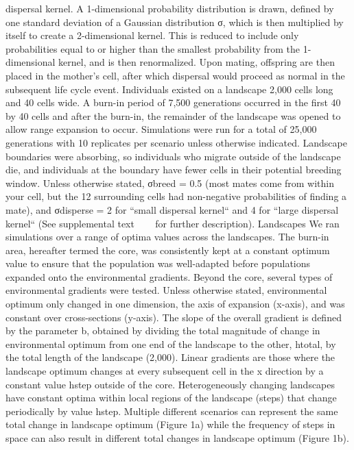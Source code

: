 dispersal kernel. A 1-dimensional probability distribution is drawn, defined by one standard 
deviation of a Gaussian distribution σ, which is then multiplied by itself to create a 2-dimensional 
kernel. This is reduced to include only probabilities equal to or higher than the smallest 
probability from the 1-dimensional kernel, and is then renormalized. Upon mating, offspring 
are then placed in the mother’s cell, after which dispersal would proceed as normal in the 
subsequent life cycle event.
Individuals existed on a landscape 2,000 cells long and 40 cells wide. A burn-in period 
of 7,500 generations occurred in the first 40 by 40 cells and after the burn-in, the 
remainder of the landscape was opened to allow range expansion to occur. Simulations 
were run for a total of 25,000 generations with 10 replicates per scenario unless otherwise 
indicated. Landscape boundaries were absorbing, so individuals who migrate outside of the 
landscape die, and individuals at the boundary have fewer cells in their potential breeding 
window. Unless otherwise stated, σbreed = 0.5 (most mates come from within your cell, but 
the 12 surrounding cells had non-negative probabilities of finding a mate), and σdisperse = 2 
for ``small dispersal kernel`` and 4 for ``large dispersal kernel`` (See supplemental text ~~~ for 
further description). 
Landscapes
We ran simulations over a range of optima values across the landscapes. The burn-in area, 
hereafter termed the core, was consistently kept at a constant optimum value to ensure that 
the population was well-adapted before populations expanded onto the environmental gradients. 
Beyond the core, several types of environmental gradients were tested. Unless otherwise stated, 
environmental optimum only changed in one dimension, the axis of expansion (x-axis), and was 
constant over cross-sections (y-axis). The slope of the overall gradient is defined by the 
parameter b, obtained by dividing the total magnitude of change in environmental optimum 
from one end of the landscape to the other, htotal, by the total length of the landscape (2,000). 
Linear gradients are those where the landscape optimum changes at every subsequent cell in the x 
direction by a constant value hstep outside of the core. Heterogeneously changing landscapes have 
constant optima within local regions of the landscape (steps) that change periodically by value hstep. 
Multiple different scenarios can represent the same total change in landscape optimum (Figure 1a) 
while the frequency of steps in space can also result in different total changes in landscape 
optimum (Figure 1b).

